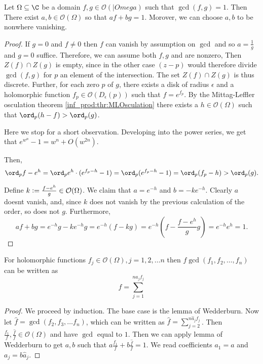 \begin{lema}[Wedderburn]
    Let $\Omega \subseteq \C$ be a domain $f, g \in \mathcal{O}(|Omega)$ such that $\gcd(f, g) = 1$. Then There exist $a, b \in \mathcal{O}(\Omega)$ so that $a f + b g =1$. Morover, we can choose $a, b$ to be nonwhere vanishing. 
\end{lema}
\begin{proof}
    If $g = 0$ and $f \neq 0$ then $f$ can vanish by assumption on $\gcd$ and so $a = \frac{1}{g}$ and $g = 0$ suffice. Therefore, we can assume both $f, g$ and are nonzero, Then $Z(f) \cap Z(g)$ is empty, since in the other case $(z - p)$ would therefore divide $\gcd(f, g)$ for $p$ an element of the intersection. The set $Z(f) \cap Z(g)$ is thus discrete. Further, for each zero $p$ of $g$, there exists a disk of radius $\epsilon$ and a holomorphic function $f_p \in \mathcal{O}(D_{\epsilon}(p))$ such that $f = e^{f_p}$. By the Mittag-Leffler osculation theorem \ref{inf_prod:thr:MLOsculation} there exists a $h \in \mathcal{O}(\Omega)$ such that $\ord_p(h - f) > \ord_p(g)$.

    Here we stop for a short observation. Developing into the power series, we get that $e^{w^n} - 1 = w^n + O(w^{2 n})$.

    Then, 
    $$
        \ord_p{f - e^h} = \ord_p{e^h \cdot (e^{f_p - h} - 1)} = \ord_p{(e^{f_p - h} - 1)} = \ord_p(f_p - h) > \ord_p(g).
    $$

    Define $k \vcentcolon= \frac{f - e^h}{g} \in \mathcal{O}(\Omega)$. We claim that $a = e^{-h}$ and $b = -k e^{-h}$. Clearly $a$ doesnt vanish, and, since $k$ does not vanish by the previous calculation of the order, so does not $g$. Furthermore, 
    $$
        a f + b g = e^{-h}g  - k e ^{-h} g = e^{-h}(f - k g) = e^{- h}(f - \frac{f - e^h}{g}g) = e^{-h} e^h = 1.
    $$
\end{proof}

\begin{posledica}
    For holomorphic functions $f_j \in \mathcal{O}(\Omega), j = 1, 2, \ldots n$ then $f \gcd(f_1, f_2, \ldots, f_n)$ can be written as 
    $$
        f = \sum_{j = 1}^{n a_j f_j} 
    $$
\end{posledica}
\begin{proof}
    We proceed by induction. The base case is the lemma of Wedderburn. Now let $\hat{f} = \gcd(f_2, f_3, \ldots f_n)$, which can be written as $\hat{f} = \sum_{j = 2}^{n \hat{a}_j f_j}$. Then $\frac{f_1}{f}, \frac{\hat{f}}{f} \in \mathcal{O}(\Omega)$ and have $\gcd$ equal to $1$. Then we can apply lemma of Wedderburn to get $a, b$ such that $a \frac{f_1}{f} + b \frac{\hat{f}}{f} = 1$. We read coefficients $a_1 = a$ and $a_j = b \hat{a}_j$.
\end{proof}

